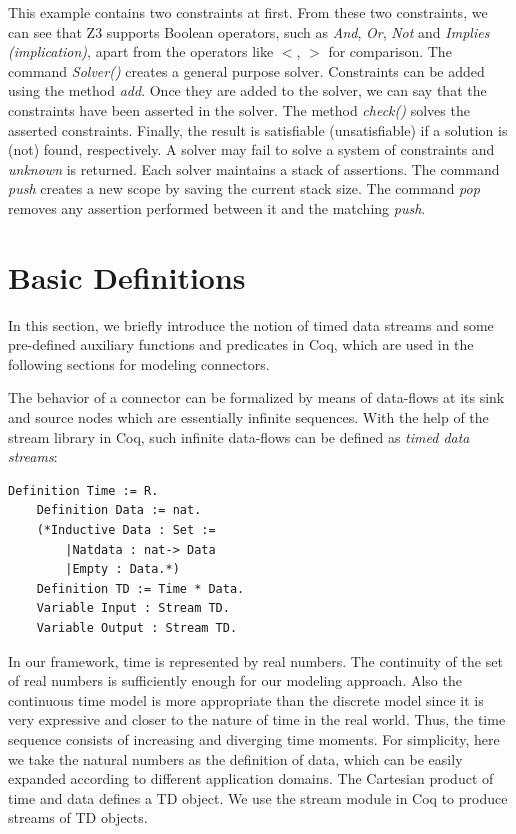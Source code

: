 \documentclass[preprint,3p]{elsarticle}
\begin{document}
This example contains two constraints at first. From these two constraints, we can see that Z3 supports Boolean operators, such as \emph{And}, \emph{Or}, \emph{Not} and \emph{Implies (implication)}, apart from the operators like $<$, $>$ for comparison.
The command \emph{Solver()} creates a general purpose solver. Constraints can be added using the method \emph{add}. Once they are added to the solver, we can say that the constraints have been asserted in the solver. The method \emph{check()} solves the asserted constraints. Finally, the result is satisfiable (unsatisfiable) if a solution is (not) found, respectively. A solver may fail to solve a system of constraints and \emph{unknown} is returned. Each solver maintains a stack of assertions. The command \emph{push} creates a new scope by saving the current stack size. The command \emph{pop} removes any assertion performed between it and the matching \emph{push}.
\section{Basic Definitions}\label{sec:basicdef}

In this section, we briefly introduce the notion of timed data streams and some pre-defined auxiliary functions and predicates in Coq, which are used in the following sections for modeling connectors.

The behavior of a connector can be formalized by means of data-flows at its sink and source nodes which are essentially infinite sequences. With the help of the stream library in Coq, such infinite data-flows can be defined as \emph{timed data streams}:
\begin{lstlisting}[language=coq]
    Definition Time := R.
    Definition Data := nat.
    (*Inductive Data : Set :=
        |Natdata : nat-> Data
        |Empty : Data.*)
    Definition TD := Time * Data.
    Variable Input : Stream TD.
    Variable Output : Stream TD.
\end{lstlisting}
%
In our framework, time is represented by real numbers. %
The continuity of the set of real numbers is sufficiently enough for our modeling approach. Also the
continuous time model is more appropriate than the discrete model since it is very expressive and closer to the nature of time in the real world. Thus, the time sequence consists of increasing and diverging time moments. For simplicity, here we take the natural numbers as the definition of data, which can be easily expanded according to different application domains. The Cartesian product of time and data defines a TD object.
We use the stream module in Coq to produce streams of TD objects.
\end{document}

